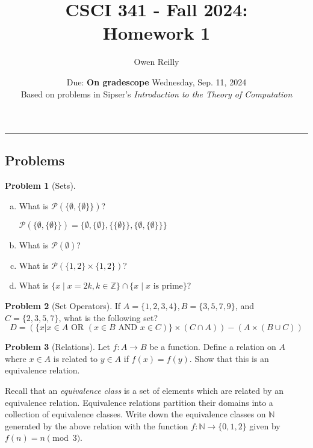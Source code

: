 \documentclass[10pt]{article}
\title{CSCI 341 - Fall 2024:\\Homework 1}
\author{Owen Reilly}
\date{Due: {\bf On gradescope} Wednesday, Sep. 11, 2024\\Based on problems in Sipser's {\em Introduction to the Theory of Computation}}
\theoremstyle{definition}
\newtheorem{problem}{Problem}
\newcommand{\ZZ}{\mathbb{Z}} %
\newcommand{\NN}{\mathbb{N}} %
\newcommand{\solution}[1]{
  \begin{tcolorbox}[breakable,title=Solution \arabic{problem}:,title after break={Solution \arabic{problem}, continued},colframe=black,colback=white,colbacktitle=white,coltitle=black,fonttitle=\bfseries,titlerule=0mm,arc=0mm,lefttitle=-1pt]
    #1
  \end{tcolorbox}
}
\begin{document}
\maketitle


\hrule
\subsection*{Problems}

\begin{problem}[Sets]\hfill
\begin{enumerate}[(a)]
\item What is $\mathcal{P}(\{\emptyset,\{\emptyset\}\})$?
\begin{solution}
    $\mathcal{P}(\{\emptyset, \{\emptyset\}\}) = \{\emptyset, \{\emptyset\}, \{\{\emptyset\}\}, \{\emptyset, \{\emptyset\}\}\}$
\end{solution}

\item What is $\mathcal{P}(\emptyset)$?
\item What is $\mathcal{P}\left(\{1,2\}\times\{1,2\}\right)$?
\item What is $\{x \mid x = 2k, k\in \ZZ\}\cap\{x \mid x\text{ is prime}\}$?
\end{enumerate}
\end{problem}


\begin{problem}[Set Operators]
If $A = \{1,2,3,4\}, B = \{3,5,7,9\}$, and $C = \{2,3,5,7\}$, what is the following set?
$$D = \left(\{x | x\in A \text{ OR } (x\in B \text{ AND } x\in C)\} \times (C\cap A)\right) - (A\times (B\cup C))$$
\end{problem}



\begin{problem}[Relations]
Let $f: A\rightarrow B$ be a function.  Define a relation on $A$ where $x \in A$ is related to $y \in A$ if $f(x) = f(y)$.  Show that this is an equivalence relation.  

Recall that an {\em equivalence class} is a set of elements which are related by an equivalence relation.  Equivalence relations partition their domains into a collection of equivalence classes.  Write down the equivalence classes on $\NN$ generated by the above relation with the function $f:\NN \rightarrow \{0,1,2\}$ given by $f(n) = n \pmod 3$.
\end{problem}
\end{document}
